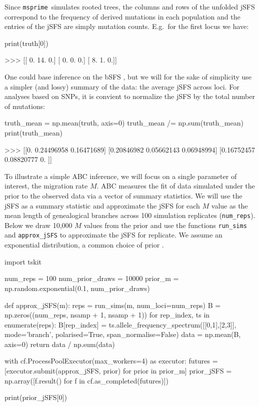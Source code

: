 \documentclass[graybox]{svmult}
\newcommand{\msprime}[0]{\texttt{msprime}}
\begin{document}
Since \msprime\ simulates rooted trees, the columns and rows
of the unfolded jSFS correspond to the frequency of derived mutations in
each population and the entries of the jSFS are simply mutation counts.
E.g.\ for the first locus we have:
\begin{pythoncode}
print(truth[0])

>>> [[ 0.  14.  0.]
     [ 0.  0.  0.]
     [ 8.  1.  0.]]
\end{pythoncode}

    One could base inference on the bSFS \citep{Lohse2016, Beeravolu2017}, but we will for the sake of simplicity use a simpler (and lossy)
summary of the data: the average jSFS across loci. For analyses based on
SNPs, it is convient to normalize the jSFS by the total number of
mutations:
\begin{pythoncode}
truth_mean = np.mean(truth, axis=0)
truth_mean /= np.sum(truth_mean)
print(truth_mean)

>>> [[0.         0.24496958 0.16471689]
     [0.20846982 0.05662143 0.06948994]
     [0.16752457 0.08820777 0.        ]]
\end{pythoncode}

    To illustrate a simple ABC inference, we will focus on a single
parameter of interest, the migration rate \(M\).
ABC measures the fit of data simulated under the prior to the observed
data via a vector of summary statistics. We will use the jSFS as a
summary statistic and approximate the jSFS for each \(M\) value as the
mean length of genealogical branches across 100 simulation replicates (\texttt{num\_reps}). Below we
draw 10,000 \(M\) values from the prior and use the functions
\texttt{run\_sims} and \texttt{approx\_jSFS} to approximate the jSFS for
 replicate. We assume an exponential distribution, a common choice of prior \citep{hey2004multilocus}.

\begin{pythoncode}
import tskit

num_reps = 100
num_prior_draws = 10000
prior_m = np.random.exponential(0.1, num_prior_draws)

def approx_jSFS(m):
    reps = run_sims(m, num_loci=num_reps)
    B = np.zeros((num_reps, nsamp + 1, nsamp + 1))
    for rep_index, ts in enumerate(reps):
        B[rep_index] = ts.allele_frequency_spectrum([[0,1],[2,3]], mode='branch', polarised=True, span_normalise=False)
    data = np.mean(B, axis=0)
    return data / np.sum(data)

with cf.ProcessPoolExecutor(max_workers=4) as executor:
    futures = [executor.submit(approx_jSFS, prior) for prior in prior_m]
    prior_jSFS = np.array([f.result() for f in cf.as_completed(futures)])

print(prior_jSFS[0])
\end{pythoncode}
\end{document}
